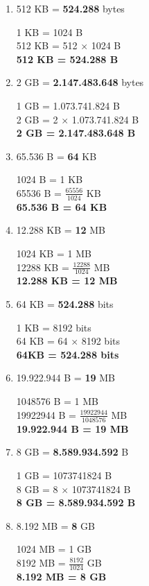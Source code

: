 \documentclass{article}
\begin{document}
\begin{enumerate}
    \item 512 KB = \textbf{524.288} bytes

    1 KB = 1024 B \\
    512 KB = 512 $\times$ 1024 B \\
    \textbf{512 KB =  524.288 B}

    \item 2 GB = \textbf{2.147.483.648} bytes
    
    1 GB = 1.073.741.824 B \\
    2 GB = 2 $\times$ 1.073.741.824 B \\
    \textbf{2 GB = 2.147.483.648 B}

    \item 65.536 B = \textbf{64} KB
    
    1024 B = 1 KB \\
    65536 B = $\frac{65556}{1024}$ KB \\
    \textbf{65.536 B = 64 KB}

    \item 12.288 KB = \textbf{12} MB
    
    1024 KB = 1 MB \\
    12288 KB = $\frac{12288}{1024}$ MB \\
    \textbf{12.288 KB = 12 MB}

    \item 64 KB = \textbf{524.288} bits
    
    1 KB = 8192 bits \\
    64 KB = 64 $\times$ 8192 bits \\
    \textbf{64KB = 524.288 bits}

    \item 19.922.944 B = \textbf{19} MB
    
    1048576 B = 1 MB \\
    19922944 B = $\frac{19922944}{1048576}$ MB \\
    \textbf{19.922.944 B = 19 MB}

    \item 8 GB = \textbf{8.589.934.592} B
    
    1 GB = 1073741824 B \\
    8 GB = 8 $\times$ 1073741824 B \\
    \textbf{8 GB = 8.589.934.592 B}

    \item 8.192 MB = \textbf{8} GB
    
    1024 MB = 1 GB \\
    8192 MB = $\frac{8192}{1024}$ GB \\
    \textbf{8.192 MB = 8 GB}


\end{enumerate}
\end{document}
